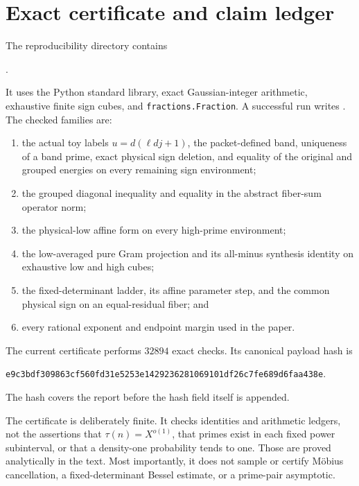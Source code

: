 \section{Exact certificate and claim ledger}
\label{sec:tpc45-certificate}

The reproducibility directory contains
\begin{center}
 .
\end{center}
It uses the Python standard library, exact Gaussian-integer arithmetic,
exhaustive finite sign cubes, and \texttt{fractions.Fraction}.  A
successful run writes
.  The checked families are:
\begin{enumerate}[label=\textup{(\roman*)},leftmargin=2.4em]
 \item the actual toy labels \(u=d(\ell d j+1)\), the packet-defined
 band, uniqueness of a band prime, exact physical sign deletion, and
 equality of the original and grouped energies on every remaining sign
 environment;
 \item the grouped diagonal inequality and equality in the abstract
 fiber-sum operator norm;
 \item the physical-low affine form on every high-prime environment;
 \item the low-averaged pure Gram projection and its all-minus synthesis
 identity on exhaustive low and high cubes;
 \item the fixed-determinant ladder, its affine parameter step, and the
 common physical sign on an equal-residual fiber; and
 \item every rational exponent and endpoint margin used in the paper.
\end{enumerate}
The current certificate performs \(32894\) exact checks.  Its canonical
payload hash is
\begin{center}
\texttt{e9c3bdf309863cf560fd31e5253e1429236281069101df26c7fe689d6faa438e}.
\end{center}
The hash covers the report before the hash field itself is appended.

The certificate is deliberately finite.  It checks identities and
arithmetic ledgers, not the assertions that \(\tau(n)=X^{o(1)}\), that
primes exist in each fixed power subinterval, or that a density-one
probability tends to one.  Those are proved analytically in the text.
Most importantly, it does not sample or certify M\"obius cancellation,
a fixed-determinant Bessel estimate, or a prime-pair asymptotic.

